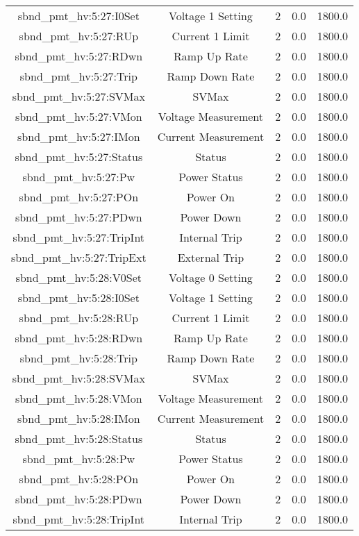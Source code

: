 \begin{center}
\begin{longtable}{c | c c c c }
sbnd\_pmt\_hv:5:27:I0Set & Voltage 1 Setting & 2 & 0.0 & 1800.0\\ 
sbnd\_pmt\_hv:5:27:RUp & Current 1 Limit & 2 & 0.0 & 1800.0\\ 
sbnd\_pmt\_hv:5:27:RDwn & Ramp Up Rate & 2 & 0.0 & 1800.0\\ 
sbnd\_pmt\_hv:5:27:Trip & Ramp Down Rate & 2 & 0.0 & 1800.0\\ 
sbnd\_pmt\_hv:5:27:SVMax & SVMax & 2 & 0.0 & 1800.0\\ 
sbnd\_pmt\_hv:5:27:VMon & Voltage Measurement & 2 & 0.0 & 1800.0\\ 
sbnd\_pmt\_hv:5:27:IMon & Current Measurement & 2 & 0.0 & 1800.0\\ 
sbnd\_pmt\_hv:5:27:Status & Status & 2 & 0.0 & 1800.0\\ 
sbnd\_pmt\_hv:5:27:Pw & Power Status & 2 & 0.0 & 1800.0\\ 
sbnd\_pmt\_hv:5:27:POn & Power On & 2 & 0.0 & 1800.0\\ 
sbnd\_pmt\_hv:5:27:PDwn & Power Down & 2 & 0.0 & 1800.0\\ 
sbnd\_pmt\_hv:5:27:TripInt & Internal Trip & 2 & 0.0 & 1800.0\\ 
sbnd\_pmt\_hv:5:27:TripExt & External Trip & 2 & 0.0 & 1800.0\\ 
sbnd\_pmt\_hv:5:28:V0Set & Voltage 0 Setting & 2 & 0.0 & 1800.0\\ 
sbnd\_pmt\_hv:5:28:I0Set & Voltage 1 Setting & 2 & 0.0 & 1800.0\\ 
sbnd\_pmt\_hv:5:28:RUp & Current 1 Limit & 2 & 0.0 & 1800.0\\ 
sbnd\_pmt\_hv:5:28:RDwn & Ramp Up Rate & 2 & 0.0 & 1800.0\\ 
sbnd\_pmt\_hv:5:28:Trip & Ramp Down Rate & 2 & 0.0 & 1800.0\\ 
sbnd\_pmt\_hv:5:28:SVMax & SVMax & 2 & 0.0 & 1800.0\\ 
sbnd\_pmt\_hv:5:28:VMon & Voltage Measurement & 2 & 0.0 & 1800.0\\ 
sbnd\_pmt\_hv:5:28:IMon & Current Measurement & 2 & 0.0 & 1800.0\\ 
sbnd\_pmt\_hv:5:28:Status & Status & 2 & 0.0 & 1800.0\\ 
sbnd\_pmt\_hv:5:28:Pw & Power Status & 2 & 0.0 & 1800.0\\ 
sbnd\_pmt\_hv:5:28:POn & Power On & 2 & 0.0 & 1800.0\\ 
sbnd\_pmt\_hv:5:28:PDwn & Power Down & 2 & 0.0 & 1800.0\\ 
sbnd\_pmt\_hv:5:28:TripInt & Internal Trip & 2 & 0.0 & 1800.0\\ 

\end{longtable}
\end{center}
